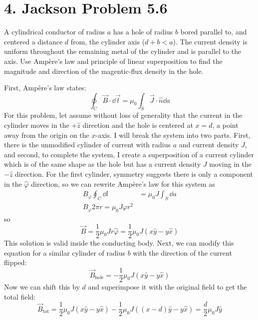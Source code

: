 \documentclass[a4paper,twoside]{article}
\begin{document}
\section*{4. Jackson Problem 5.6}
A cylindrical conductor of radius $ a $ has a hole of radius $ b $ bored parallel to, and centered a distance $ d $ from, the cylinder axis ($ d+b<a $). The current density is uniform throughout the remaining metal of the cylinder and is parallel to the axis. Use Amp\`ere's law and principle of linear superposition to find the magnitude and direction of the magentic-flux density in the hole.
\begin{problem}
    First, Amp\`ere's law states:
    \begin{equation}
        \oint_C \vec{B} \cdot \dd{ \vec{l}} = \mu_0 \int_S \vec{J} \cdot \hat{n}\dd{a}
    \end{equation}
    For this problem, let assume without loss of generality that the current in the cylinder moves in the $ + \hat{z} $ direction and the hole is centered at $ x = d $, a point away from the origin on the $ x $-axis. I will break the system into two parts. First, there is the unmodified cylinder of current with radius $ a $ and current density $ J $, and second, to complete the system, I create a superposition of a current cylinder which is of the same shape as the hole but has a current density $ J $ moving in the $ - \hat{z} $ direction.
    For the first cylinder, symmetry suggests there is only a component in the $ \hat{\varphi} $ direction, so we can rewrite Amp\`ere's law for this system as
    \begin{align}
        B_{\varphi} \oint_C \dd{l} &= \mu_0 J \int_S \dd{a}\\
        B_{\varphi} 2 \pi r = \mu_0 J \varphi r^2
    \end{align}
    so
    \begin{equation}
        \vec{B} = \frac{1}{2} \mu_0 J r \hat{\varphi} = \frac{1}{2} \mu_0 J (x \hat{y} - y \hat{x})
    \end{equation}
    This solution is valid inside the conducting body. Next, we can modify this equation for a similar cylinder of radius $ b $ with the direction of the current flipped:
    \begin{equation}
        \vec{B}_{\text{hole}} = - \frac{1}{2} \mu_0 J (x \hat{y} - y \hat{x})
    \end{equation}
    Now we can shift this by $ d $ and superimpose it with the original field to get the total field:
    \begin{equation}
        \vec{B}_{\text{tot}} = \frac{1}{2} \mu_0 J (x \hat{y} - y \hat{x}) - \frac{1}{2} \mu_0 J ( (x-d) \hat{y} - y \hat{x} ) = \frac{d}{2} \mu_0 J \hat{y}
    \end{equation}
\end{problem}
\end{document}
